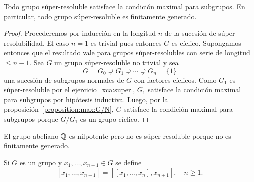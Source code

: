 \begin{proposition}
	\label{proposition:superfg}
	Todo grupo súper-resoluble satisface la condición maximal para subgrupos. En
	particular, todo grupo súper-resoluble es finitamente generado.
\end{proposition}

\begin{proof}
	Procederemos por inducción en la longitud $n$ de la sucesión de
	súper-resolubilidad.  El caso $n=1$ es trivial pues entonces $G$ es cíclico.
	Supongamos entonces que el resultado vale para grupos súper-resolubles con
	serie de longitud $\leq n-1$.  Sea $G$ un grupo súper-resoluble no trivial y sea 
	\[
	G=G_0\supsetneq
	G_1\supsetneq\cdots\supsetneq G_n=\{1\}
	\]
	una sucesión de subgrupos normales de $G$ con factores cíclicos. Como
	$G_{1}$ es súper-resoluble por el ejercicio~\ref{xca:super},
	$G_{1}$ satisface la condición maximal para subgrupos por hipótesis
	inductiva.  Luego, por la proposición~\ref{proposition:max:G/N}, $G$ satisface la condición maximal para subgrupos porque
	$G/G_{1}$ es un grupo cíclico.
\end{proof}

%

\begin{example}
	El grupo abeliano $\mathbb{Q}$ es nilpotente pero no es súper-resoluble
	porque no es finitamente generado.
\end{example}


Si $G$ es un grupo y $x_1,\dots,x_{n+1}\in G$ se define 
\[
[x_1,\dots,x_{n+1}]=\left[ [x_1,\dots,x_n],x_{n+1} \right],\quad
n\geq1.
\]

